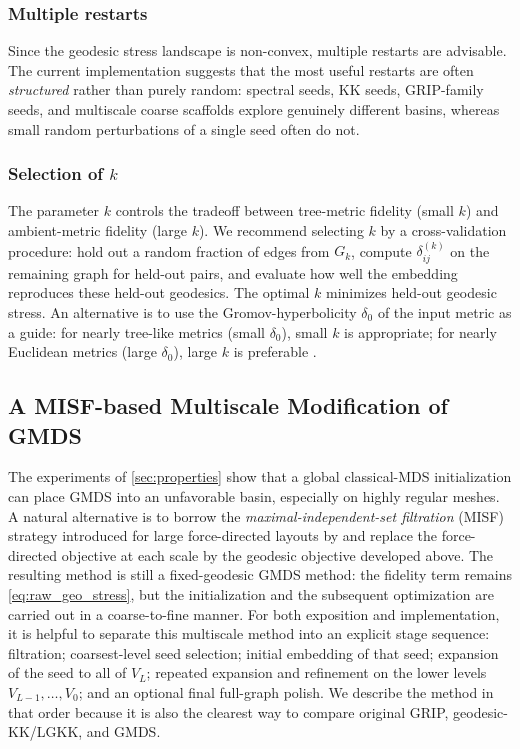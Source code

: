 \documentclass[11pt]{article}
\newcommand{\Gk}{G_k}
\begin{document}
\subsubsection*{Multiple restarts}
Since the geodesic stress landscape is non-convex, multiple restarts are
advisable.  The current implementation suggests that the most useful restarts
are often \emph{structured} rather than purely random: spectral seeds, KK
seeds, GRIP-family seeds, and multiscale coarse scaffolds explore genuinely
different basins, whereas small random perturbations of a single seed often do
not.

\subsubsection*{Selection of $k$}
The parameter $k$ controls the tradeoff between tree-metric fidelity
(small $k$) and ambient-metric fidelity (large $k$).  We recommend
selecting $k$ by a cross-validation procedure: hold out a random fraction
of edges from $\Gk$, compute $\delta^{(k)}_{ij}$ on the remaining graph
for held-out pairs, and evaluate how well the embedding reproduces these
held-out geodesics.  The optimal $k$ minimizes held-out geodesic stress.
An alternative is to use the Gromov-hyperbolicity $\delta_0$ of the input
metric as a guide: for nearly tree-like metrics (small $\delta_0$), small
$k$ is appropriate; for nearly Euclidean metrics (large $\delta_0$), large
$k$ is preferable \citep{gromov1987hyperbolic}.

\FloatBarrier
\subsection{A MISF-based Multiscale Modification of GMDS}
\label{sec:misf_gmds}

The experiments of \cref{sec:properties} show that a global classical-MDS
initialization can place GMDS into an unfavorable basin, especially on highly
regular meshes.  A natural alternative is to borrow the
\emph{maximal-independent-set filtration} (MISF) strategy introduced for large
force-directed layouts by \citet{gajer2004multidimensional,gajer2002grip} and
replace the force-directed objective at each scale by the geodesic objective
developed above.  The resulting method is still a fixed-geodesic GMDS method:
the fidelity term remains \cref{eq:raw_geo_stress}, but the initialization and
the subsequent optimization are carried out in a coarse-to-fine manner.
For both exposition and implementation, it is helpful to separate this
multiscale method into an explicit stage sequence:
filtration; coarsest-level seed selection; initial embedding of that seed;
expansion of the seed to all of $V_L$; repeated expansion and refinement on the
lower levels $V_{L-1},\dots,V_0$; and an optional final full-graph polish.
We describe the method in that order because it is also the clearest way to
compare original GRIP, geodesic-KK/LGKK, and GMDS.
\end{document}
